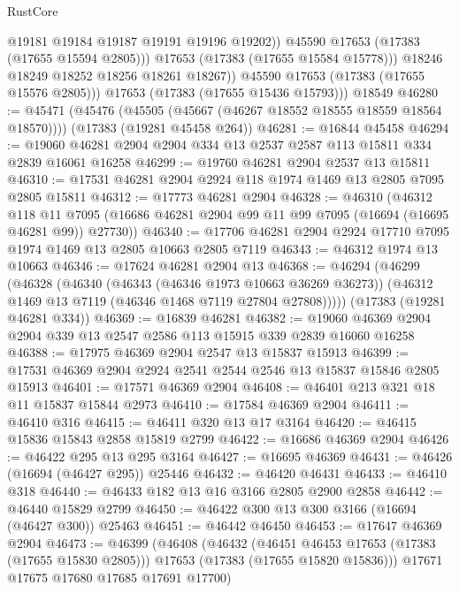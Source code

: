 \begin{lexlean}{RustCore}
\begin{coremodule}
                    @19181
                    @19184
                    @19187
                    @19191
                    @19196
                    @19202))
                @45590
                @17653
                (@17383 (@17655 @15594 @2805)))
              @17653
              (@17383 (@17655 @15584 @15778)))
            @18246
            @18249
            @18252
            @18256
            @18261
            @18267))
        @45590
        @17653
        (@17383 (@17655 @15576 @2805)))
      @17653
      (@17383 (@17655 @15436 @15793)))
    @18549
@46280 := @45471
    (@45476 (@45505 (@45667 (@46267 @18552 @18555 @18559 @18564 @18570))))
    (@17383 (@19281 @45458 @264))
@46281 := @16844 @45458
@46294 := @19060 @46281 @2904 @2904 @334 @13 @2537 @2587 @113 @15811 @334 @2839 @16061 @16258
@46299 := @19760 @46281 @2904 @2537 @13 @15811
@46310 := @17531 @46281 @2904 @2924 @118 @1974 @1469 @13 @2805 @7095 @2805 @15811
@46312 := @17773 @46281 @2904
@46328 := @46310
    (@46312
      @118
      @11
      @7095
      (@16686 @46281 @2904 @99 @11 @99 @7095 (@16694 (@16695 @46281 @99)) @27730))
@46340 := @17706 @46281 @2904 @2924 @17710 @7095 @1974 @1469 @13 @2805 @10663 @2805 @7119
@46343 := @46312 @1974 @13 @10663
@46346 := @17624 @46281 @2904 @13
@46368 := @46294
    (@46299
      (@46328
        (@46340
          (@46343 (@46346 @1973 @10663 @36269 @36273))
          (@46312 @1469 @13 @7119 (@46346 @1468 @7119 @27804 @27808)))))
    (@17383 (@19281 @46281 @334))
@46369 := @16839 @46281
@46382 := @19060 @46369 @2904 @2904 @339 @13 @2547 @2586 @113 @15915 @339 @2839 @16060 @16258
@46388 := @17975 @46369 @2904 @2547 @13 @15837 @15913
@46399 := @17531 @46369 @2904 @2924 @2541 @2544 @2546 @13 @15837 @15846 @2805 @15913
@46401 := @17571 @46369 @2904
@46408 := @46401 @213 @321 @18 @11 @15837 @15844 @2973
@46410 := @17584 @46369 @2904
@46411 := @46410 @316
@46415 := @46411 @320 @13 @17 @3164
@46420 := @46415 @15836 @15843 @2858 @15819 @2799
@46422 := @16686 @46369 @2904
@46426 := @46422 @295 @13 @295 @3164
@46427 := @16695 @46369
@46431 := @46426 (@16694 (@46427 @295)) @25446
@46432 := @46420 @46431
@46433 := @46410 @318
@46440 := @46433 @182 @13 @16 @3166 @2805 @2900 @2858
@46442 := @46440 @15829 @2799
@46450 := @46422 @300 @13 @300 @3166 (@16694 (@46427 @300)) @25463
@46451 := @46442 @46450
@46453 := @17647 @46369 @2904
@46473 := @46399
    (@46408
      (@46432
        (@46451 @46453 @17653 (@17383 (@17655 @15830 @2805)))
        @17653
        (@17383 (@17655 @15820 @15836)))
      @17671
      @17675
      @17680
      @17685
      @17691
      @17700)

\end{coremodule}
\end{lexlean}
